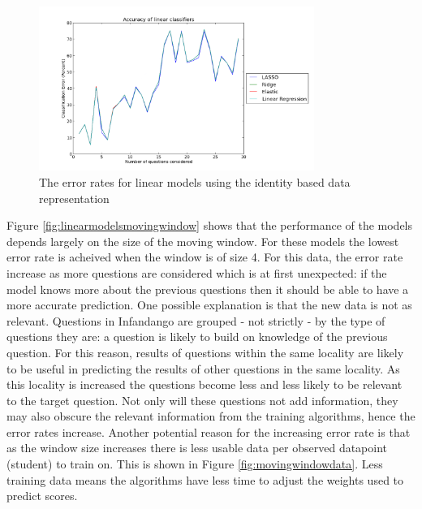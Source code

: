 \begin{figure}[b!]
\centering
\includegraphics[width=0.8\textwidth]{images/linearmodelsidentified.png}
\caption{The error rates for linear models using the identity based data representation}
\label{fig:linearmodelsidentified}
\end{figure}

Figure \ref{fig:linearmodelsmovingwindow} shows that the performance of the models depends largely on the size of the moving window. For these models the lowest error rate is acheived when the window is of size 4. For this data, the error rate increase as more questions are considered which is at first unexpected: if the model knows more about the previous questions then it should be able to have a more accurate prediction. 
One possible explanation is that the new data is not as relevant. Questions in Infandango are grouped - not strictly - by the type of questions they are: a question is likely to build on knowledge of the previous question. For this reason, results of questions within the same locality are likely to be useful in predicting the results of other questions in the same locality. As this locality is increased the questions become less and less likely to be relevant to the target question. Not only will these questions {\texit not add} information, they may also obscure the relevant information from the training algorithms, hence the error rates increase.
Another potential reason for the increasing error rate is that as the window size increases there is less usable data per observed datapoint (student) to train on. This is shown in Figure \ref{fig:movingwindowdata}. Less training data means the algorithms have less time to adjust the weights used to predict scores.

